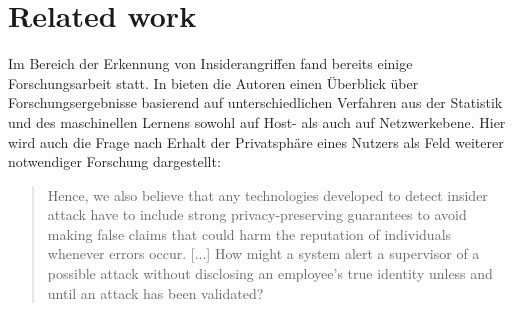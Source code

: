 \section{Related work}
\label{related_work}


Im Bereich der Erkennung von Insiderangriffen fand bereits einige Forschungsarbeit statt. In \cite{salem2008survey} bieten die Autoren einen Überblick über Forschungsergebnisse basierend auf unterschiedlichen Verfahren aus der Statistik und des maschinellen Lernens sowohl auf Host- als auch auf Netzwerkebene. Hier wird auch die Frage nach Erhalt der Privatsphäre eines Nutzers als Feld weiterer notwendiger Forschung dargestellt:

\begin{quotation}
Hence, we also believe that any technologies developed
to detect insider attack have to include strong privacy-preserving guarantees
to avoid making false claims that could harm the reputation of individuals
whenever errors occur. [...] 
How might a system alert a supervisor of a possible attack without disclosing
an employee’s true identity unless and until an attack has been validated?
\cite{salem2008survey}
\end{quotation}




